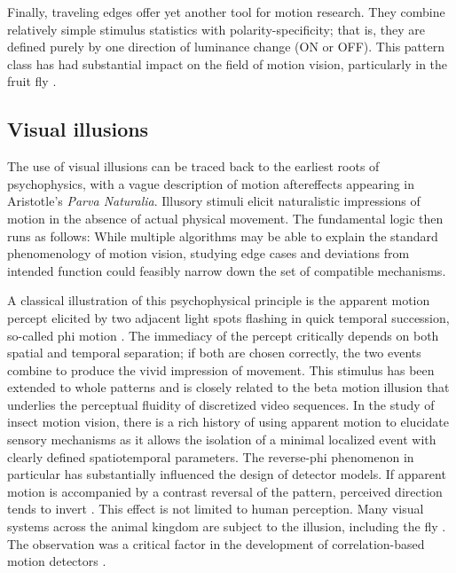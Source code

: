 Finally, traveling edges offer yet another tool for motion research. They combine relatively simple stimulus statistics with polarity-specificity; that is, they are defined purely by one direction of luminance change (ON or OFF). This pattern class has had substantial impact on the field of motion vision, particularly in the fruit fly \citep{Joesch:2010fw,Eichner:2011ic,Clark:2011gw}.

\subsection{Visual illusions}
The use of visual illusions can be traced back to the earliest roots of psychophysics, with a vague description of motion aftereffects appearing in Aristotle's \textit{Parva Naturalia}. Illusory stimuli elicit naturalistic impressions of motion in the absence of actual physical movement. The fundamental logic then runs as follows: While multiple algorithms may be able to explain the standard phenomenology of motion vision, studying edge cases and deviations from intended function could feasibly narrow down the set of compatible mechanisms.

A classical illustration of this psychophysical principle is the apparent motion percept elicited by two adjacent light spots flashing in quick temporal succession, so-called phi motion \citep{Wertheimer:1912aa}. The immediacy of the percept critically depends on both spatial and temporal separation; if both are chosen correctly, the two events combine to produce the vivid impression of movement. This stimulus has been extended to whole patterns \citep{Anstis:1970tv} and is closely related to the beta motion illusion that underlies the perceptual fluidity of discretized video sequences. In the study of insect motion vision, there is a rich history of using apparent motion to elucidate sensory mechanisms as it allows the isolation of a minimal localized event with clearly defined spatiotemporal parameters. The reverse-phi phenomenon in particular has substantially influenced the design of detector models. If apparent motion is accompanied by a contrast reversal of the pattern, perceived direction tends to invert \citep{Anstis:1975tu,Chubb:1989tw}. This effect is not limited to human perception. Many visual systems across the animal kingdom are subject to the illusion, including the fly \citep{Egelhaaf:1992wh,Orger:2000cy,Krekelberg:2005cb,Tuthill:2011ic,Eichner:2011ic,Clark:2011gw}. The observation was a critical factor in the development of correlation-based motion detectors \citep{Hassenstein:1956fa}.

